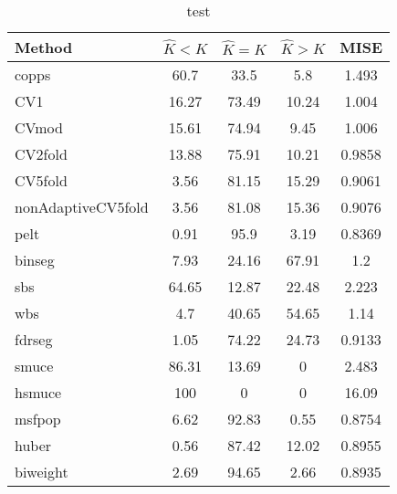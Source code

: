 \begin{table}[ht]
\centering
\begin{tabular}{l|cccc}
  \hline
Method & $\hat{K} < K$ & $\hat{K} = K$ & $\hat{K} > K$ & MISE \\ 
  \hline
copps &  60.7 &  33.5 &   5.8 & 1.493 \\ 
  CV1 & 16.27 & 73.49 & 10.24 & 1.004 \\ 
  CVmod & 15.61 & 74.94 &  9.45 & 1.006 \\ 
  CV2fold & 13.88 & 75.91 & 10.21 & 0.9858 \\ 
  CV5fold &  3.56 & 81.15 & 15.29 & 0.9061 \\ 
  nonAdaptiveCV5fold &  3.56 & 81.08 & 15.36 & 0.9076 \\ 
  pelt &  0.91 &  95.9 &  3.19 & 0.8369 \\ 
  binseg &  7.93 & 24.16 & 67.91 &   1.2 \\ 
  sbs & 64.65 & 12.87 & 22.48 & 2.223 \\ 
  wbs &   4.7 & 40.65 & 54.65 &  1.14 \\ 
  fdrseg &  1.05 & 74.22 & 24.73 & 0.9133 \\ 
  smuce & 86.31 & 13.69 &     0 & 2.483 \\ 
  hsmuce &   100 &     0 &     0 & 16.09 \\ 
  msfpop &  6.62 & 92.83 &  0.55 & 0.8754 \\ 
  huber &  0.56 & 87.42 & 12.02 & 0.8955 \\ 
  biweight &  2.69 & 94.65 &  2.66 & 0.8935 \\ 
   \hline
\end{tabular}
\caption{test} 
\end{table}
